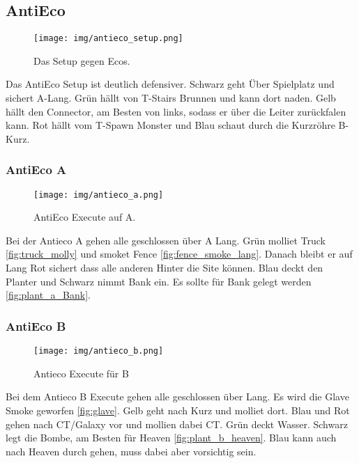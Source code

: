 \subsection{AntiEco}
\begin{figure}
    \centering
    \texttt{[image: img/antieco\_setup.png]}
    \caption{Das Setup gegen Ecos.}
    \label{fig:antieco_setup}
\end{figure}
Das AntiEco Setup ist deutlich defensiver. Schwarz geht Über Spielplatz und sichert A-Lang. Grün hällt von T-Stairs Brunnen und kann dort naden. Gelb hällt den Connector, am Besten von links, sodass er über die Leiter zurückfalen kann.
Rot hällt vom T-Spawn Monster und Blau schaut durch die Kurzröhre B-Kurz.
\subsubsection{AntiEco A}
\begin{figure}
    \centering
    \texttt{[image: img/antieco\_a.png]}
    \caption{AntiEco Execute auf A.}
    \label{fig:antieco_a}
\end{figure}
Bei der Antieco A gehen alle geschlossen über A Lang. Grün molliet Truck \ref{fig:truck_molly} und smoket Fence \ref{fig:fence_smoke_lang}. 
Danach bleibt er auf Lang Rot sichert dass alle anderen Hinter die Site können. Blau deckt den Planter und Schwarz nimmt Bank ein. Es sollte für Bank gelegt werden \ref{fig:plant_a_Bank}.
\FloatBarrier
\subsubsection{AntiEco B}
\begin{figure}
    \centering
    \texttt{[image: img/antieco\_b.png]}
    \caption{Antieco Execute für B}
    \label{fig:antieco_b}
\end{figure}
Bei dem Antieco B Execute gehen alle geschlossen über Lang. Es wird die Glave Smoke geworfen \ref{fig:glave}. Gelb geht nach Kurz und molliet dort. Blau und Rot gehen nach CT/Galaxy vor und mollien dabei CT.
Grün deckt Wasser. Schwarz legt die Bombe, am Besten für Heaven \ref{fig:plant_b_heaven}. Blau kann auch nach Heaven durch gehen, muss dabei aber vorsichtig sein.
